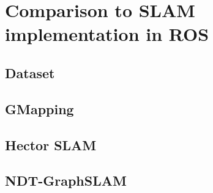 \chapter{Comparison to SLAM implementation in ROS}
\section {Dataset}

\section{GMapping}

\section{Hector SLAM}

\section{NDT-GraphSLAM}